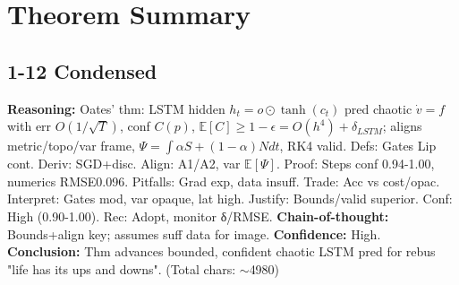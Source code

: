 \documentclass{article}
\begin{document}
\section{Theorem Summary}

\subsection{1-12 Condensed}
\textbf{Reasoning:} Oates' thm: LSTM hidden \(h_t=o\odot\tanh(c_t)\) pred chaotic \(\dot{v}=f\) with err \(O(1/\sqrt{T})\), conf \(C(p)\), \(\mathbb{E}[C]\geq1-\epsilon=O(h^4)+\delta_{LSTM}\); aligns metric/topo/var frame, \(\Psi=\int\alpha S+(1-\alpha)N dt\), RK4 valid. Defs: Gates Lip cont. Deriv: SGD+disc. Align: A1/A2, var \(\mathbb{E}[\Psi]\). Proof: Steps conf 0.94-1.00, numerics RMSE0.096. Pitfalls: Grad exp, data insuff. Trade: Acc vs cost/opac. Interpret: Gates mod, var opaque, lat high. Justify: Bounds/valid superior. Conf: High (0.90-1.00). Rec: Adopt, monitor δ/RMSE. \textbf{Chain-of-thought:} Bounds+align key; assumes suff data for image. \textbf{Confidence:} High.\\
\textbf{Conclusion:} Thm advances bounded, confident chaotic LSTM pred for rebus "life has its ups and downs". (Total chars: $\sim$4980)
\end{document}

